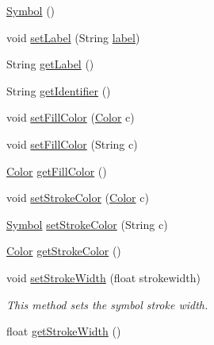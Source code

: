 \begin{DoxyCompactItemize}
\item 
\mbox{\hyperlink{classbridges_1_1base_1_1_symbol_a5449cffb7ffdbab093a110957158acc6}{Symbol}} ()
\item 
void \mbox{\hyperlink{classbridges_1_1base_1_1_symbol_af6b944374cbd34334caac28d948a3f21}{set\+Label}} (String \mbox{\hyperlink{classbridges_1_1base_1_1_symbol_ad2adcc82e6a96c2f3c465702502655e9}{label}})
\item 
String \mbox{\hyperlink{classbridges_1_1base_1_1_symbol_a7616c25b288a6e464f4f0b5fe4bd2826}{get\+Label}} ()
\item 
String \mbox{\hyperlink{classbridges_1_1base_1_1_symbol_a53cea862b06ffc230ca68d4d34c8820d}{get\+Identifier}} ()
\item 
void \mbox{\hyperlink{classbridges_1_1base_1_1_symbol_a850688e5157674aee916fef6cd9e0b8c}{set\+Fill\+Color}} (\mbox{\hyperlink{classbridges_1_1base_1_1_color}{Color}} c)
\item 
void \mbox{\hyperlink{classbridges_1_1base_1_1_symbol_a3a2c48d9707ff3fa7a832e77b679b1b9}{set\+Fill\+Color}} (String c)
\item 
\mbox{\hyperlink{classbridges_1_1base_1_1_color}{Color}} \mbox{\hyperlink{classbridges_1_1base_1_1_symbol_aed2e531266c8a3bc563709c6486380cc}{get\+Fill\+Color}} ()
\item 
void \mbox{\hyperlink{classbridges_1_1base_1_1_symbol_a387a5a5691e55e84a1d0367ca2066806}{set\+Stroke\+Color}} (\mbox{\hyperlink{classbridges_1_1base_1_1_color}{Color}} c)
\item 
\mbox{\hyperlink{classbridges_1_1base_1_1_symbol}{Symbol}} \mbox{\hyperlink{classbridges_1_1base_1_1_symbol_ae9aa7d4e9b497875017a9b6e0eaab181}{set\+Stroke\+Color}} (String c)
\item 
\mbox{\hyperlink{classbridges_1_1base_1_1_color}{Color}} \mbox{\hyperlink{classbridges_1_1base_1_1_symbol_abd38aaea2fc344adcc8096ed6eb8681c}{get\+Stroke\+Color}} ()
\item 
void \mbox{\hyperlink{classbridges_1_1base_1_1_symbol_a68f46f0e555e916c59a69d2b3e9e495d}{set\+Stroke\+Width}} (float strokewidth)
\begin{DoxyCompactList}\small\item\em This method sets the symbol stroke width. \end{DoxyCompactList}\item 
float \mbox{\hyperlink{classbridges_1_1base_1_1_symbol_a9c79f84ba764b7683c99c5deb1f5a191}{get\+Stroke\+Width}} ()
\item 

\end{DoxyCompactItemize}
